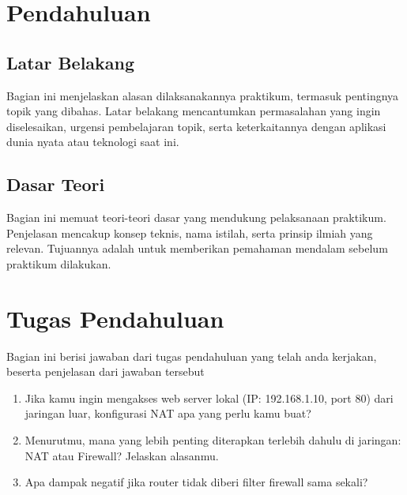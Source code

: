 \section{Pendahuluan}
\subsection{Latar Belakang}
Bagian ini menjelaskan alasan dilaksanakannya praktikum, termasuk pentingnya topik yang dibahas. Latar belakang mencantumkan permasalahan yang ingin diselesaikan, urgensi pembelajaran topik, serta keterkaitannya dengan aplikasi dunia nyata atau teknologi saat ini.

\subsection{Dasar Teori}
Bagian ini memuat teori-teori dasar yang mendukung pelaksanaan praktikum. Penjelasan mencakup konsep teknis, nama istilah, serta prinsip ilmiah yang relevan. Tujuannya adalah untuk memberikan pemahaman mendalam sebelum praktikum dilakukan.

\section{Tugas Pendahuluan}
Bagian ini berisi jawaban dari tugas pendahuluan yang telah anda kerjakan, beserta penjelasan dari jawaban tersebut
\begin{enumerate}
	\item Jika kamu ingin mengakses web server lokal (IP: 192.168.1.10, port 80) dari jaringan luar, konfigurasi NAT apa yang perlu kamu buat?
	\item Menurutmu, mana yang lebih penting diterapkan terlebih dahulu di jaringan: NAT atau Firewall? Jelaskan alasanmu.
	\item Apa dampak negatif jika router tidak diberi filter firewall sama sekali?
\end{enumerate}